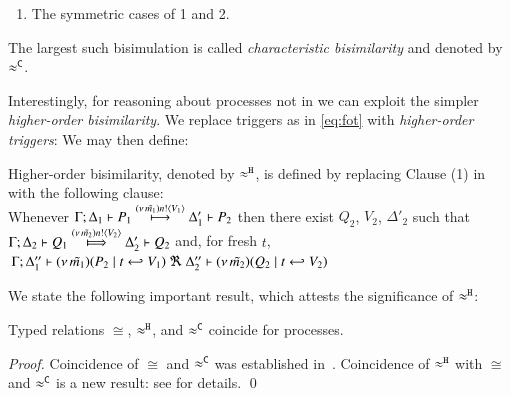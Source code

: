 \documentclass[runningheads]{llncs}
\begin{document}
{\begin{definition}
\begin{enumerate}[1)]
		\item	The symmetric cases of 1 and 2.                
	\end{enumerate}
	The largest such bisimulation
	is called \emph{characteristic bisimilarity} {and} denoted by $\approx^\mathtt{C}$.
\end{definition}
 


Interestingly, for reasoning about \HOp processes not in \sessp we can exploit the simpler \emph{higher-order bisimilarity}.
We replace triggers as in \eqref{eq:fot}
with \emph{higher-order triggers}:
We may then define:
\begin{definition}%
	\label{d:hbw}
	Higher-order bisimilarity, denoted by $\approx^\mathtt{H}$, is defined {by} replacing 
	Clause (1) in  with the following clause:\\[1mm]
	Whenever 
	$\Gamma; \Delta_1 \vdash P_1 \stackrel{(\nu\, \tilde{m_1}) n ! \langle V_1 \rangle}{\longmapsto} \Delta_1' \vdash P_2$ %
	then there exist 
	$Q_2$, $V_2$, $\Delta'_2$
	such that \\
	$\horel{\Gamma}{\Delta_2}{Q_1}{\Hby{\news{\tilde{m_2}}\bactout{n}{V_2}}}{\Delta_2'}{Q_2}$ %
	and, for fresh $t$, \\[1mm]
	$
	\begin{array}{lrlll}
		\!\!\Gamma; \Delta''_1  \vdash  {(\nu\, \tilde{m_1})(P_2 \;|\;t \hookleftarrow V_1)}
		\ \Re\ \Delta''_2
		\vdash {(\nu\, \tilde{m_2})(Q_2 \;|\;t \hookleftarrow V_2)}
	\end{array}
	$
\end{definition}

We state the following important result, which attests the significance of $\approx^\mathtt{H}$:
\begin{theorem}\label{t:coincide}
	Typed relations $\cong$, $\approx^\mathtt{H}$, and $\approx^\mathtt{C}$ coincide for \HOp processes.
\end{theorem}
\begin{proof}
Coincidence of $\cong$ and $\approx^\mathtt{C}$ was established in~\cite{characteristic_bis}.
Coincidence of $\approx^\mathtt{H}$ with $\cong$ and $\approx^\mathtt{C}$ is a new result: see \cite{KouzapasPY15}
for details. \qed
\end{proof}

}
\end{document}
